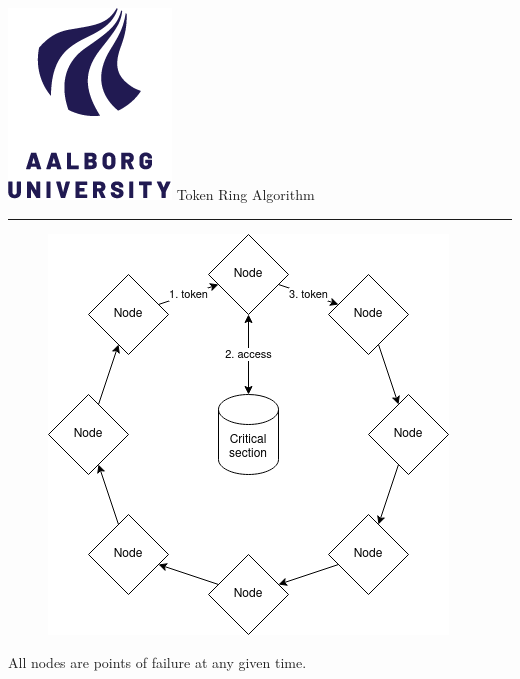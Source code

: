 \documentclass[aspectratio=1610,17pt,utf8]{beamer}
\newcommand{\regularframe}[1]{\color{black}\includegraphics[width=.05\textwidth]{figures/aau.png} #1\\\hrule}
\begin{document}
\begin{frame}{\regularframe{Token Ring Algorithm}}
    \begin{minipage}{.45\textwidth}
        \begin{figure}
            \includegraphics[width=\textwidth]{figures/1-token.png}
        \end{figure}
    \end{minipage}
    \begin{minipage}{.5\textwidth}
        \tiny{All nodes are points of failure at any given time.}
    \end{minipage}
\end{frame}
\end{document}
